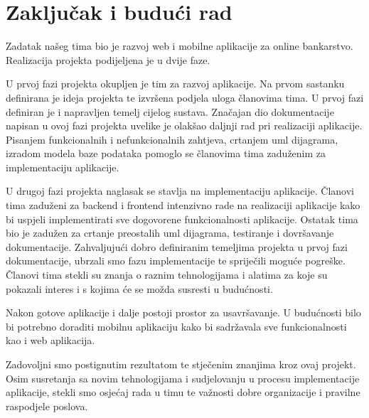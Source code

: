 \chapter{Zaključak i budući rad}

		 Zadatak našeg tima bio je razvoj web i mobilne aplikacije za online bankarstvo. Realizacija projekta podijeljena je u dvije faze.
		 
		 U prvoj fazi projekta okupljen je tim za razvoj aplikacije. Na prvom sastanku definirana je ideja projekta te izvršena podjela uloga članovima tima. 
		 U prvoj fazi definiran je i napravljen temelj cijelog sustava. Značajan dio dokumentacije napisan u ovoj fazi projekta uvelike je olakšao daljnji rad pri realizaciji aplikacije. Pisanjem funkcionalnih i nefunkcionalnih zahtjeva, crtanjem uml dijagrama, izradom modela baze podataka pomoglo se članovima tima zaduženim za implementaciju aplikacije.
		 
		 U drugoj fazi projekta naglasak se stavlja na implementaciju aplikacije. Članovi tima zaduženi za backend i frontend intenzivno rade na realizaciji aplikacije kako bi uspjeli implementirati sve dogovorene funkcionalnosti aplikacije. Ostatak tima bio je zadužen za crtanje preostalih uml dijagrama, testiranje i dovršavanje dokumentacije. Zahvaljujući dobro definiranim temeljima projekta u prvoj fazi dokumentacije, ubrzali smo fazu implementacije te spriječili moguće pogreške. Članovi tima stekli su znanja o raznim tehnologijama i alatima za koje su pokazali interes i s kojima će se možda susresti u budućnosti.
		 
		 Nakon gotove aplikacije i dalje postoji prostor za usavršavanje. U budućnosti bilo bi potrebno doraditi mobilnu aplikaciju kako bi sadržavala sve funkcionalnosti kao i web aplikacija.
		 
		 Zadovoljni smo postignutim rezultatom te stječenim znanjima kroz ovaj projekt. Osim susretanja sa novim tehnologijama i sudjelovanju u procesu implementacije aplikacije, stekli smo osjećaj rada u timu te važnosti dobre organizacije i pravilne raspodjele poslova.
		
		\eject 
